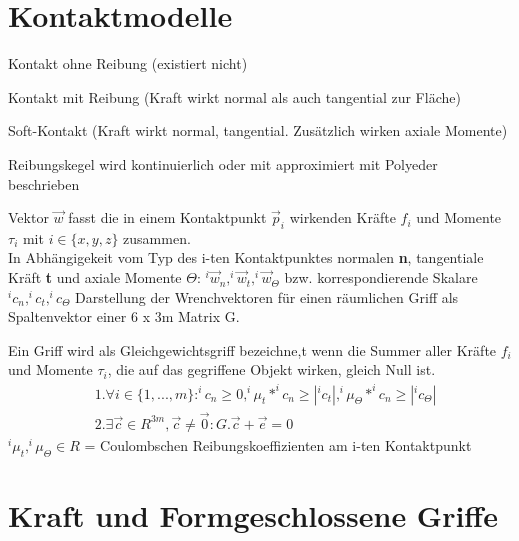 \section{Kontaktmodelle}
\begin{compactitem}
    \item Kontakt ohne Reibung (existiert nicht)
    \item Kontakt mit Reibung (Kraft wirkt normal als auch tangential zur Fläche)
    \item Soft-Kontakt (Kraft wirkt normal, tangential. Zusätzlich wirken axiale Momente)
\end{compactitem}
Reibungskegel wird kontinuierlich oder mit approximiert mit Polyeder beschrieben

Vektor $\vec{w}$ fasst die in einem Kontaktpunkt $\vec{p}_i$ wirkenden Kräfte $f_i$ und Momente
$\tau_i$ mit $i \in \{x,y,z\}$ zusammen. \\
In Abhängigekeit vom Typ des i-ten Kontaktpunktes normalen \textbf{n}, tangentiale Kräft \textbf{t} und
axiale Momente \textbf{$\Theta$}: $^i\vec{w}_n, ^i\vec{w}_t, ^i\vec{w}_\Theta$ bzw. korrespondierende
Skalare $^ic_n, ^ic_t, ^ic_\Theta$
Darstellung der Wrenchvektoren für einen räumlichen Griff als Spaltenvektor einer 6 x 3m Matrix G.

Ein Griff wird als Gleichgewichtsgriff bezeichne,t wenn die Summer aller Kräfte $f_i$ und Momente
$\tau_i$, die auf das gegriffene Objekt wirken, gleich Null ist.
\begin{align}
    &1. \forall i \in \{1, ...,m\} : ^ic_n \geq 0, ^i\mu_t * ^ic_n \geq |^ic_t|, ^i\mu_\Theta * ^ic_n
    \geq |^ic_\Theta| \\
    &2. \exists \vec{c} \in R^{3m}, \vec{c} \neq \vec{0} : G.\vec{c} + \vec{e} = 0
\end{align}
$^i\mu_t, ^i\mu_\Theta \in R$ = Coulombschen Reibungskoeffizienten am i-ten Kontaktpunkt

\section{Kraft und Formgeschlossene Griffe}
